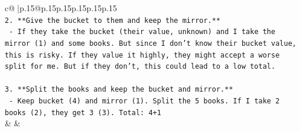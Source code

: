 \documentclass{article}
\begin{document}
{\begin{supertabular}{c@{$\;$}|p{.15\linewidth}@{}p{.15\linewidth}p{.15\linewidth}p{.15\linewidth}p{.15\linewidth}p{.15\linewidth}}
{{{\\ 
\texttt{2. **Give the bucket to them and keep the mirror.**} \\
\texttt{   {-} If they take the bucket (their value, unknown) and I take the mirror (1) and some books. But since I don't know their bucket value, this is risky. If they value it highly, they might accept a worse split for me. But if they don't, this could lead to a low total.} \\
\\ 
\texttt{3. **Split the books and keep the bucket and mirror.**} \\
\texttt{   {-} Keep bucket (4) and mirror (1). Split the 5 books. If I take 2 books (2), they get 3 (3). Total: 4+1} \\
            }
        }
    }
    & & \\ \\


\end{supertabular}}
\end{document}
